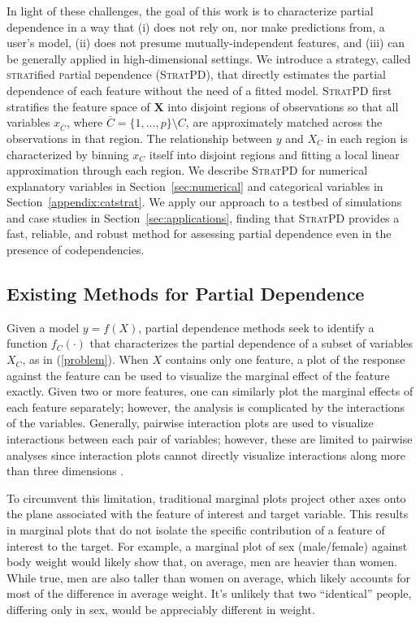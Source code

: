 \documentclass[12pt]{article}
\newcommand{\secref}[1]{Section~\ref{#1}}
\newcommand{\spd}{\fontfamily{cmr}\textsc{\small StratPD}}
\newcommand{\xnC}{$x_{\overline{C}}$}
\begin{document}
In light of these challenges, the goal of this work is to characterize partial dependence in a way that (i) does not rely on, nor make predictions from, a user's model,  (ii) does not presume mutually-independent features, and (iii) can be generally applied in high-dimensional settings. We introduce a strategy, called {\textsc{strat}ified \textsc{p}artial \textsc{d}ependence} (\spd{}), that directly estimates the partial dependence of each feature without the need of a fitted model. \spd{} first stratifies the feature space of $\mathbf{X}$ into disjoint regions of observations so that all variables \xnC{}, where $\overline{C} = \{1, \ldots, p\} \setminus C$, are approximately matched across the observations in that region. The relationship between $y$ and $X_C$ in each region is characterized by binning ${x}_C$ itself into disjoint regions and fitting a local linear approximation through each region. We describe \spd{} for numerical explanatory variables in \secref{sec:numerical} and categorical variables in \secref{appendix:catstrat}. We apply our approach to a testbed of simulations and case studies in \secref{sec:applications}, finding that \spd{} provides a fast, reliable, and robust method for assessing partial dependence even in the presence of codependencies. 

\subsection{Existing Methods for Partial Dependence}

Given a model $y = f(X)$, partial dependence methods seek to identify a function $f_C(\cdot)$ that characterizes the partial dependence of a subset of variables $X_C$, as in (\ref{problem}). When $X$ contains only one feature, a plot of the response against the feature can be used to visualize the marginal effect of the feature exactly. Given two or more features, one can similarly plot the marginal effects of each feature separately; however, the analysis is complicated by the interactions of the variables. Generally, pairwise interaction plots are used to visualize interactions between each pair of variables; however, these are limited to pairwise analyses since interaction plots cannot directly visualize interactions along more than three dimensions \citep{cox2014multivariate}.

To circumvent this limitation, traditional marginal plots project other axes onto the plane associated with the feature of interest and target variable. This results in marginal plots that do not isolate the specific contribution of a feature of interest to the target. For example, a marginal plot of sex (male/female) against body weight would likely show that, on average, men are heavier than women. While true, men are also taller than women on average, which likely accounts for most of the difference in average weight. It's unlikely that two ``identical'' people, differing only in sex, would be appreciably different in weight.  
\end{document}
